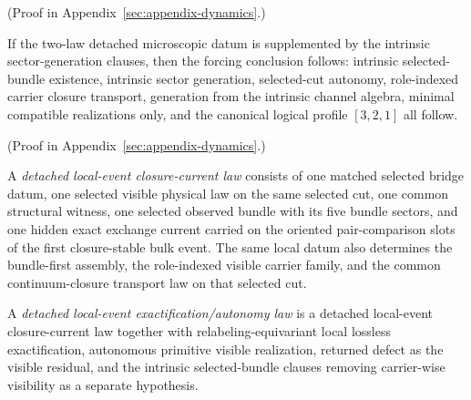 (Proof in Appendix~\ref{sec:appendix-dynamics}.)

\begin{corollary}
\label{cor:two-law-detached-microscopic-package-plus-intrinsic-sector-clauses-closes-current-forcing-seam}
If the two-law detached microscopic datum is supplemented by the intrinsic
sector-generation clauses, then the forcing conclusion follows: intrinsic selected-bundle
existence, intrinsic sector generation, selected-cut autonomy, role-indexed
carrier closure transport, generation from the intrinsic channel algebra,
minimal compatible realizations only, and the canonical logical profile
\([3,2,1]\) all follow.
\end{corollary}

(Proof in Appendix~\ref{sec:appendix-dynamics}.)

\begin{definition}
\label{def:detached-local-event-closure-current-law}
A \emph{detached local-event closure-current law} consists of one matched
selected bridge datum, one selected visible physical law on the same
selected cut, one common structural witness, one selected observed bundle
with its five bundle sectors, and one hidden exact exchange current carried on
the oriented pair-comparison slots of the first closure-stable bulk event. The
same local datum also determines the bundle-first assembly, the role-indexed
visible carrier family, and the common continuum-closure transport law on that
selected cut.
\end{definition}

\begin{definition}
\label{def:detached-local-event-exactification-autonomy-law}
A \emph{detached local-event exactification/autonomy law} is a detached
local-event closure-current law together with relabeling-equivariant local
lossless exactification, autonomous primitive visible realization, returned defect
as the visible residual, and the intrinsic selected-bundle clauses removing
carrier-wise visibility as a separate hypothesis.
\end{definition}

